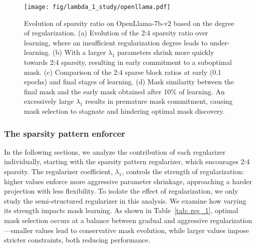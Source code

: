 \begin{figure*}[!t]
    \centering
    \texttt{[image: fig/lambda\_1\_study/openllama.pdf]} 
\caption{Evolution of sparsity ratio on OpenLlama-7b-v2 based on the degree of regularization. (a) Evolution of the 2:4 sparsity ratio over learning, where an insufficient regularization degree leads to under-learning. (b) With a larger $\lambda_{1}$ parameters shrink more quickly towards 2:4 sparsity, resulting in early commitment to a suboptimal mask. (c) Comparison of the 2:4 sparse block ratios at early (0.1 epochs) and final stages of learning. (d) Mask similarity between the final mask and the early mask obtained after 10\% of learning. An excessively large $\lambda_{1}$ results in premature mask commitment, causing mask selection to stagnate and hindering optimal mask discovery.}
    \label{fig:openllama-lambda}
\end{figure*}
\subsubsection{The sparsity pattern enforcer}
\label{sec:lambda1}



In the following sections, we analyze the contribution of each regularizer individually, starting with the sparsity pattern regularizer, which encourages 2:4 sparsity.
The regularizer coefficient, $\lambda_{1}$, controls the strength of regularization: higher values enforce more aggressive parameter shrinkage, approaching a harder projection with less flexibility.
To isolate the effect of regularization, we only study the semi-structured regularizer in this analysis. We examine how varying its strength impacts mask learning. As shown in Table~\ref{tab: reg_1}, optimal mask selection occurs at a balance between gradual and aggressive regularization—smaller values lead to conservative mask evolution, while larger values impose stricter constraints, both reducing performance.




